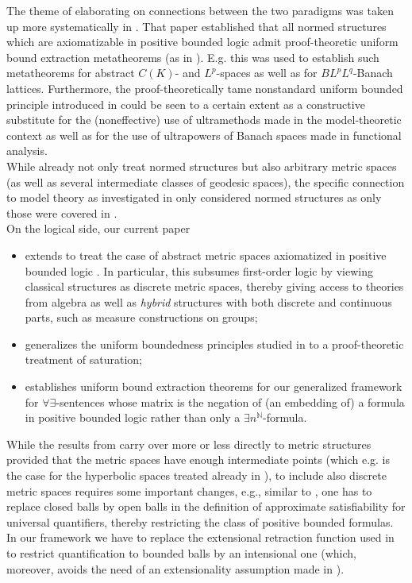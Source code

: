 \documentclass[11pt]{amsart}
\theoremstyle{definition}
\theoremstyle{remark}
\def\NN{\mathbb{N}}
\begin{document}
The theme of elaborating on connections between the two paradigms was taken up more
systematically in \cite{GuK2016}. That paper established that all normed
structures which are axiomatizable in positive bounded logic admit proof-theoretic uniform bound extraction metatheorems (as in \cite{kohlenbach2005some,GeK2008}). E.g. this was used to establish such metatheorems for
abstract $C(K)$- and $L^p$-spaces as well as for $BL^pL^q$-Banach lattices.
Furthermore,
the proof-theoretically tame nonstandard uniform bounded principle introduced
in \cite{Kohlenbach(06)} could be seen to a certain extent as a constructive substitute
for the (noneffective) use of ultramethods made in the model-theoretic
context as well as for the use of ultrapowers of Banach spaces made
in functional analysis.
\\[1mm]

While already \cite{kohlenbach2005some,GeK2008} not only treat normed
structures but also arbitrary metric spaces (as well as several intermediate
classes of geodesic spaces), the specific connection to model theory as
investigated in \cite{GuK2016} only considered normed structures as only
those were covered in \cite{henson2002ultraproducts}. \\[1mm]

On the logical side,
our current paper
\begin{itemize}
\item
extends \cite{GuK2016} to treat the case of abstract metric spaces
axiomatized in positive bounded logic
\cite{avigad2013ultraproducts,DI2017}. In particular, this subsumes
first-order logic by viewing classical structures as discrete metric spaces,
thereby giving access to theories from algebra as well as \emph{hybrid}
structures with both discrete and continuous parts, such as measure
constructions on groups;
\item
generalizes the uniform boundedness principles studied in \cite{GuK2016} to
a proof-theoretic treatment of saturation;
\item
establishes uniform bound extraction theorems for our generalized framework
for $\forall\exists$-sentences whose matrix is the negation of (an embedding
of) a formula in positive bounded logic rather than only a
$\exists n^{\NN}$-formula.
\end{itemize}
While the results from \cite{GuK2016} carry over more or less directly
to metric structures provided that the metric spaces have enough
intermediate points (which e.g. is the case for the hyperbolic spaces
treated already in \cite{kohlenbach2005some,GeK2008}), to include also
discrete metric spaces requires some important changes, e.g., similar
to \cite{DI2017}, one has to replace closed balls by open balls in the
definition of approximate satisfiability for universal quantifiers, thereby
restricting the class of positive bounded formulas. In our framework we
have to replace the extensional retraction function used in \cite{GuK2016}
to restrict quantification to bounded balls by an intensional one (which,
moreover, avoids the need of an extensionality assumption made in
 \cite{GuK2016}). \\[1mm]
 
\end{document}
